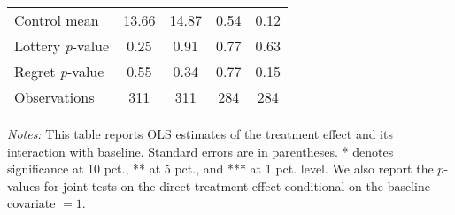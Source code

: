\begin{table}[ht]
{\begin{threeparttable}
\begin{tabular}{l*{4}{c}}
Control mean    &    13.66         &    14.87         &     0.54         &     0.12         \\
Lottery \emph{p}-value&     0.25         &     0.91         &     0.77         &     0.63         \\
Regret \emph{p}-value&     0.55         &     0.34         &     0.77         &     0.15         \\
Observations    &      311         &      311         &      284         &      284         \\
\bottomrule \end{tabular} \begin{tablenotes}[flushleft] \footnotesize \item \emph{Notes:} This table reports OLS estimates of the treatment effect and its interaction with baseline. Standard errors are in parentheses. * denotes significance at 10 pct., ** at 5 pct., and *** at 1 pct. level. We also report the \(p\)-values for joint tests on the direct treatment effect conditional on the baseline covariate $= 1$. \end{tablenotes} \end{threeparttable} } \end{table}

